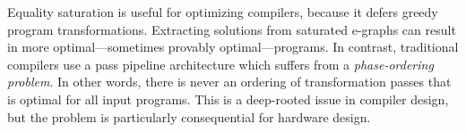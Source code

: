 Equality saturation is useful for optimizing compilers, because it defers
greedy program transformations. Extracting solutions from saturated e-graphs
can result in more optimal---sometimes provably optimal---programs. In
contrast, traditional compilers use a pass pipeline architecture which suffers
from a \textit{phase-ordering problem}. In other words, there is never an
ordering of transformation passes that is optimal for all input programs. This
is a deep-rooted issue in compiler design, but the problem is particularly
consequential for hardware design.
